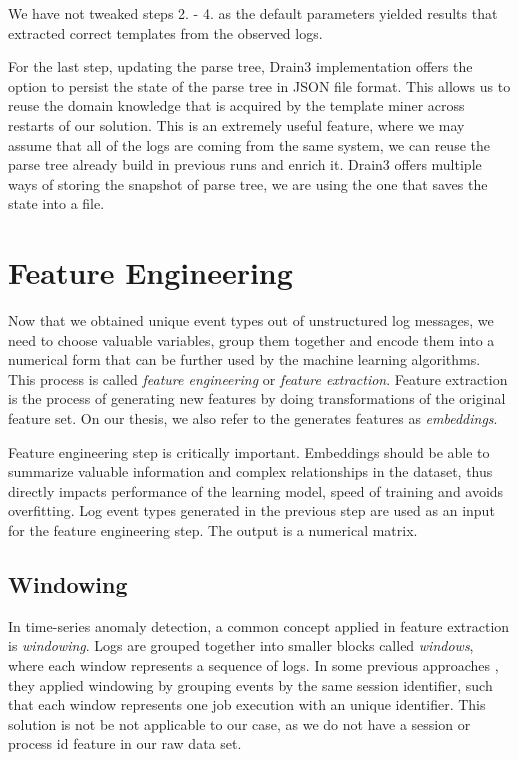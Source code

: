 We have not tweaked steps 2. - 4. as the default parameters \cite{ibmdrain3} yielded results that extracted correct templates from the observed logs.

For the last step, updating the parse tree, Drain3 implementation offers the option to persist the state of the parse tree in JSON file format. This allows us to reuse the  domain knowledge that is acquired by the template miner across restarts of our solution.
This is an extremely useful feature, where we may assume that all of the logs are coming from the same system, we can reuse the parse tree already build in previous runs and enrich it.
Drain3 offers multiple ways of storing the snapshot of parse tree, we are using the one that saves the state into a file.

\section{Feature Engineering}
\label{section:featureEngineering}
Now that we obtained unique event types out of unstructured log messages, we need to choose valuable variables, group them together and encode them into a numerical form that can be further used by the machine learning algorithms. This process is called \textit{feature engineering} or \textit{feature extraction}. Feature extraction is the process of generating new features by doing transformations of the original feature set. On our thesis, we also refer to the generates features as \textit{embeddings}.

Feature engineering step is critically important. Embeddings should be able to summarize valuable information and complex relationships in the dataset, thus directly impacts performance of the learning model, speed of training and avoids overfitting. Log event types generated in the previous step are used as an input for the feature engineering step. The output is a numerical matrix. 

\subsection{Windowing}

In time-series anomaly detection, a common concept applied in feature extraction is \textit{windowing}. 
Logs are grouped together into smaller blocks called \textit{windows}, where each window represents a sequence of logs. In some previous approaches \cite{xu2009}, they applied windowing by grouping events by the same session identifier, such that each window represents one job execution with an unique identifier. This solution is not be not applicable to our case, as we do not have a session or process id feature in our raw data set.

